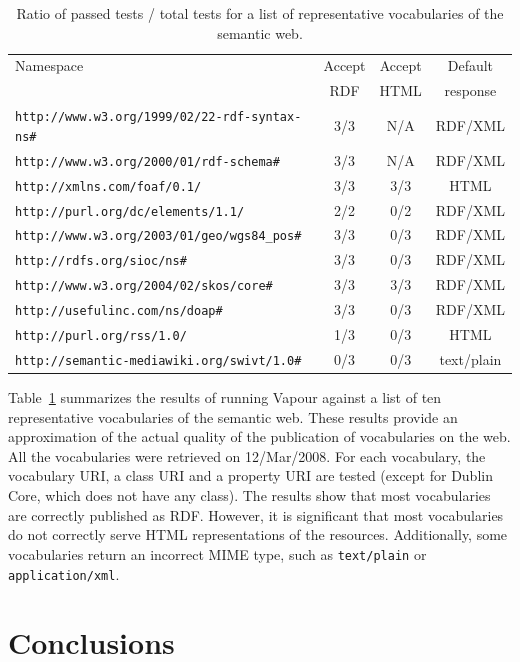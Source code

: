 \documentclass{../templates/llncs}
\begin{document}
\begin{table}[t]
\caption{Ratio of passed tests / total tests for a list of representative vocabularies of the semantic web.}
\centering
\begin{tabular}{lccc}
\hline
Namespace & Accept & Accept & Default \\
 & RDF & HTML & response \\
\hline\hline
\texttt{http://www.w3.org/1999/02/22-rdf-syntax-ns\#} & 3/3 & N/A & RDF/XML \\
\texttt{http://www.w3.org/2000/01/rdf-schema\#} & 3/3 & N/A & RDF/XML \\
\texttt{http://xmlns.com/foaf/0.1/} & 3/3 & 3/3 & HTML \\
\texttt{http://purl.org/dc/elements/1.1/} & 2/2 & 0/2 & RDF/XML \\
\texttt{http://www.w3.org/2003/01/geo/wgs84\_pos\#} & 3/3 & 0/3 & RDF/XML \\
\texttt{http://rdfs.org/sioc/ns\#} & 3/3 & 0/3 & RDF/XML \\
\texttt{http://www.w3.org/2004/02/skos/core\#} & 3/3 & 3/3 & RDF/XML \\
\texttt{http://usefulinc.com/ns/doap\#} & 3/3 & 0/3 & RDF/XML \\
\texttt{http://purl.org/rss/1.0/} & 1/3 & 0/3 & HTML \\
\texttt{http://semantic-mediawiki.org/swivt/1.0\#} & 0/3 & 0/3 & text/plain \\ [1ex]
\hline
\end{tabular}
\label{tab:usage}
\end{table}

Table~\ref{tab:usage} summarizes the results of running Vapour against a list of
ten representative vocabularies of the semantic web. These results provide an
approximation of the actual quality of the publication of vocabularies on the web. 
All the vocabularies were retrieved on 12/Mar/2008. For each vocabulary, the vocabulary URI, a class URI and a property URI are tested
(except for Dublin Core, which does not have any class). The results show that
most vocabularies are correctly published as RDF. However, it is significant that
most vocabularies do not correctly serve HTML representations of the resources.
Additionally, some vocabularies return an incorrect MIME type,
such as \texttt{text/plain} or \texttt{application/xml}.

\section{\label{sec:conclusions}Conclusions}
\end{document}
